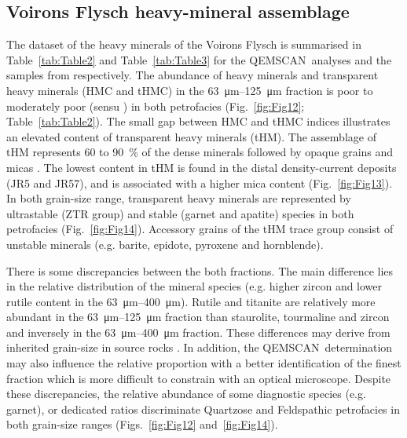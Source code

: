 \documentclass[twoside]{article}
\newcommand\registred{\textsuperscript{\tiny\textregistered}}
\begin{document}
\subsection{Voirons Flysch heavy-mineral assemblage}

The dataset of the heavy minerals of the Voirons Flysch is summarised in Table~\ref{tab:Table2} and Table~\ref{tab:Table3} for the QEMSCAN\registred\ analyses and the samples from \cite{Ragusa2009} respectively. The abundance of heavy minerals and transparent heavy minerals (HMC and tHMC) in the \SIrange{63}{125}{\micro\meter} fraction is poor to moderately poor (sensu \citealp{Garzanti2010}) in both petrofacies (Fig.~\ref{fig:Fig12}; Table~\ref{tab:Table2}). The small gap between HMC and tHMC indices illustrates an elevated content of transparent heavy minerals (tHM). The assemblage of tHM represents 60 to 90~\% of the dense minerals followed by opaque grains and micas \citep{Ragusa2015}. The lowest content in tHM is found in the distal density-current deposits (JR5 and JR57), and is associated with a higher mica content (Fig.~\ref{fig:Fig13}). In both grain-size range, transparent heavy minerals are represented by ultrastable (ZTR group) and stable (garnet and apatite) species in both petrofacies (Fig.~\ref{fig:Fig14}). Accessory grains of the tHM trace group consist of unstable minerals (e.g. barite, epidote, pyroxene and hornblende).\par
There is some discrepancies between the both fractions. The main difference lies in the relative distribution of the mineral species (e.g. higher zircon and lower rutile content in the \SIrange{63}{400}{\micro\meter}). Rutile and titanite are relatively more abundant in the \SIrange{63}{125}{\micro\meter} fraction than staurolite, tourmaline and zircon and inversely in the \SIrange{63}{400}{\micro\meter} fraction. These differences may derive from inherited grain-size in source rocks \citep{Morton1999}. In addition, the QEMSCAN\registred\ determination may also influence the relative proportion with a better identification of the finest fraction which is more difficult to constrain with an optical microscope. Despite these discrepancies, the relative abundance of some diagnostic species (e.g. garnet), or dedicated ratios discriminate Quartzose and Feldspathic petrofacies in both grain-size ranges (Figs.~\ref{fig:Fig12} and~\ref{fig:Fig14}).
\end{document}

